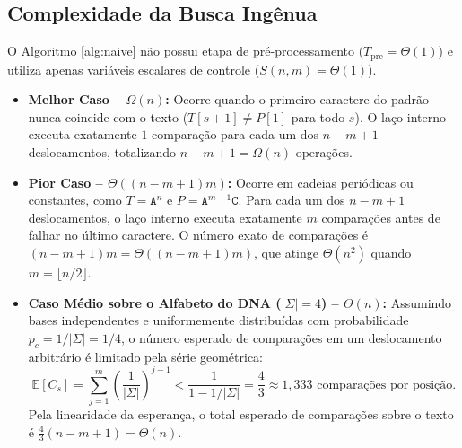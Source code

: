 \documentclass[12pt,a4paper]{article}
\begin{document}
\subsection{Complexidade da Busca Ing\^enua}
O Algoritmo \ref{alg:naive} n\~ao possui etapa de pr\'e-processamento ($T_{\text{pre}} = \Theta(1)$) e utiliza apenas vari\'aveis escalares de controle ($S(n,m) = \Theta(1)$).
\begin{itemize}
    \item \textbf{Melhor Caso -- $\Omega(n)$:} Ocorre quando o primeiro caractere do padr\~ao nunca coincide com o texto ($T[s+1] \neq P[1]$ para todo $s$). O la\c{c}o interno executa exatamente $1$ compara\c{c}\~ao para cada um dos $n - m + 1$ deslocamentos, totalizando $n - m + 1 = \Omega(n)$ opera\c{c}\~oes.
    \item \textbf{Pior Caso -- $\Theta((n - m + 1)m)$:} Ocorre em cadeias peri\'odicas ou constantes, como $T = \texttt{A}^n$ e $P = \texttt{A}^{m-1}\texttt{C}$. Para cada um dos $n - m + 1$ deslocamentos, o la\c{c}o interno executa exatamente $m$ compara\c{c}\~oes antes de falhar no \'ultimo caractere. O n\'umero exato de compara\c{c}\~oes \'e $(n - m + 1)m = \Theta((n - m + 1)m)$, que atinge $\Theta(n^2)$ quando $m = \lfloor n/2 \rfloor$.
    \item \textbf{Caso M\'edio sobre o Alfabeto do DNA ($|\Sigma| = 4$) -- $\Theta(n)$:} Assumindo bases independentes e uniformemente distribu\'idas com probabilidade $p_c = 1/|\Sigma| = 1/4$, o n\'umero esperado de compara\c{c}\~oes em um deslocamento arbitr\'ario \'e limitado pela s\'erie geom\'etrica:
    \begin{equation}
        \mathbb{E}[C_s] = \sum_{j=1}^{m} \left(\frac{1}{|\Sigma|}\right)^{j-1} < \frac{1}{1 - 1/|\Sigma|} = \frac{4}{3} \approx 1,333\text{ compara\c{c}\~oes por posi\c{c}\~ao.}
    \end{equation}
    Pela linearidade da esperan\c{c}a, o total esperado de compara\c{c}\~oes sobre o texto \'e $\frac{4}{3}(n - m + 1) = \Theta(n)$.
\end{itemize}
\end{document}
